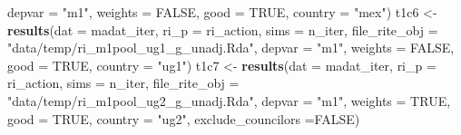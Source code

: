 \documentclass[]{article}
\newenvironment{Shaded}{\begin{snugshade}}{\end{snugshade}}
\newcommand{\KeywordTok}[1]{\textcolor[rgb]{0.13,0.29,0.53}{\textbf{#1}}}
\newcommand{\DataTypeTok}[1]{\textcolor[rgb]{0.13,0.29,0.53}{#1}}
\newcommand{\StringTok}[1]{\textcolor[rgb]{0.31,0.60,0.02}{#1}}
\newcommand{\OtherTok}[1]{\textcolor[rgb]{0.56,0.35,0.01}{#1}}
\newcommand{\NormalTok}[1]{#1}
\begin{document}
\begin{Shaded}
\begin{Highlighting}[]
                  \DataTypeTok{depvar =} \StringTok{"m1"}\NormalTok{, }\DataTypeTok{weights =} \OtherTok{FALSE}\NormalTok{, }\DataTypeTok{good =} \OtherTok{TRUE}\NormalTok{, }\DataTypeTok{country =} \StringTok{"mex"}\NormalTok{)}
\NormalTok{  t1c6 <-}\StringTok{ }\KeywordTok{results}\NormalTok{(}\DataTypeTok{dat =}\NormalTok{ madat_iter, }\DataTypeTok{ri_p =}\NormalTok{ ri_action, }\DataTypeTok{sims =}\NormalTok{ n_iter,}
                  \DataTypeTok{file_rite_obj =} \StringTok{"data/temp/ri_m1pool_ug1_g_unadj.Rda"}\NormalTok{,}
                  \DataTypeTok{depvar =} \StringTok{"m1"}\NormalTok{, }\DataTypeTok{weights =} \OtherTok{FALSE}\NormalTok{, }\DataTypeTok{good =} \OtherTok{TRUE}\NormalTok{, }\DataTypeTok{country =} \StringTok{"ug1"}\NormalTok{)}
\NormalTok{  t1c7 <-}\StringTok{ }\KeywordTok{results}\NormalTok{(}\DataTypeTok{dat =}\NormalTok{ madat_iter, }\DataTypeTok{ri_p =}\NormalTok{ ri_action, }\DataTypeTok{sims =}\NormalTok{ n_iter,}
                  \DataTypeTok{file_rite_obj =} \StringTok{"data/temp/ri_m1pool_ug2_g_unadj.Rda"}\NormalTok{,}
                  \DataTypeTok{depvar =} \StringTok{"m1"}\NormalTok{, }\DataTypeTok{weights =} \OtherTok{TRUE}\NormalTok{,  }\DataTypeTok{good =} \OtherTok{TRUE}\NormalTok{, }\DataTypeTok{country =} \StringTok{"ug2"}\NormalTok{,}
                  \DataTypeTok{exclude_councilors =}\OtherTok{FALSE}\NormalTok{)}
  

\end{Highlighting}
\end{Shaded}
\end{document}
